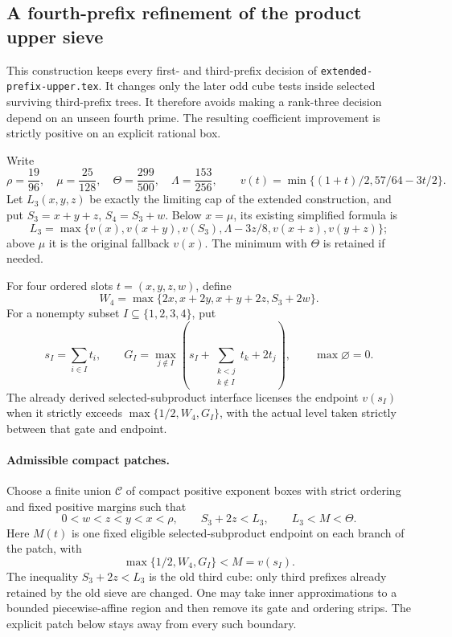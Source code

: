 \documentclass[11pt]{article}
\begin{document}

\subsection{A fourth-prefix refinement of the product upper sieve}
\label{sec:fourth-prefix-K-refinement-route}

This construction keeps every first- and third-prefix decision of
\texttt{extended-prefix-upper.tex}. It changes only the later odd
cube tests inside selected surviving third-prefix trees.
It therefore avoids making a rank-three decision depend on an
unseen fourth prime. The resulting coefficient improvement is
strictly positive on an explicit rational box.

Write
\[
 \rho=\frac{19}{96},\quad \mu=\frac{25}{128},\quad
 \Theta=\frac{299}{500},\quad \Lambda=\frac{153}{256},
 \qquad v(t)=\min\{(1+t)/2,57/64-3t/2\}.
\]
Let \(L_3(x,y,z)\) be exactly the limiting cap of the extended
construction, and put \(S_3=x+y+z\), \(S_4=S_3+w\).
Below \(x=\mu\), its existing simplified formula is
\[
 L_3=\max\{v(x),v(x+y),v(S_3),
                 \Lambda-3z/8,v(x+z),v(y+z)\};
\]
above \(\mu\) it is the original fallback \(v(x)\).
The minimum with \(\Theta\) is retained if needed.

For four ordered slots \(t=(x,y,z,w)\), define
\[
 W_4=\max\{2x,x+2y,x+y+2z,S_3+2w\}.
\]
For a nonempty subset \(I\subseteq\{1,2,3,4\}\), put
\[
 s_I=\sum_{i\in I}t_i,\qquad
 G_I=\max_{j\notin I}
       \left(s_I+\sum_{\substack{k<j\\k\notin I}}t_k+2t_j\right),
 \qquad \max\varnothing=0.
\]
The already derived selected-subproduct interface licenses
the endpoint \(v(s_I)\) when it strictly exceeds
\(\max\{1/2,W_4,G_I\}\), with the actual level taken strictly
between that gate and endpoint.

\paragraph{Admissible compact patches.}
Choose a finite union \(\mathcal C\) of compact positive exponent
boxes with strict ordering and fixed positive margins such that
\[
 0<w<z<y<x<\rho,\qquad S_3+2z<L_3,
 \qquad L_3<M<\Theta .
\]
Here \(M(t)\) is one fixed eligible selected-subproduct endpoint
on each branch of the patch, with
\[
 \max\{1/2,W_4,G_I\}<M=v(s_I).
\]
The inequality \(S_3+2z<L_3\) is the old third cube:
only third prefixes already retained by the old sieve are changed.
One may take inner approximations to a bounded piecewise-affine
region and then remove its gate and ordering strips.
The explicit patch below stays away from every such boundary.
\end{document}
